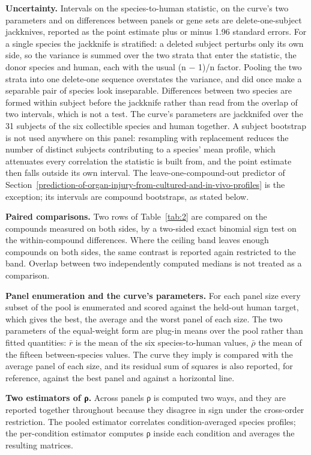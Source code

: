 \documentclass[11pt,a4paper]{article}
\begin{document}
\textbf{Uncertainty.} Intervals on the species-to-human statistic, on
the curve's two parameters and on differences between panels or gene
sets are delete-one-subject jackknives, reported as the point estimate
plus or minus 1.96 standard errors. For a single species the jackknife
is stratified: a deleted subject perturbs only its own side, so the
variance is summed over the two strata that enter the statistic, the
donor species and human, each with the usual (n − 1)/n factor. Pooling
the two strata into one delete-one sequence overstates the variance, and
did once make a separable pair of species look inseparable. Differences
between two species are formed within subject before the jackknife
rather than read from the overlap of two intervals, which is not a test.
The curve's parameters are jackknifed over the 31 subjects of the six
collectible species and human together. A subject bootstrap is not used
anywhere on this panel: resampling with replacement reduces the number
of distinct subjects contributing to a species' mean profile, which
attenuates every correlation the statistic is built from, and the point
estimate then falls outside its own interval. The leave-one-compound-out
predictor of Section~\ref{prediction-of-organ-injury-from-cultured-and-in-vivo-profiles} is the exception; its intervals are compound
bootstraps, as stated below.

\textbf{Paired comparisons.} Two rows of Table~\ref{tab:2} are compared on the
compounds measured on both sides, by a two-sided exact binomial sign
test on the within-compound differences. Where the ceiling band leaves
enough compounds on both sides, the same contrast is reported again
restricted to the band. Overlap between two independently computed
medians is not treated as a comparison.

\textbf{Panel enumeration and the curve's parameters.} For each panel
size every subset of the pool is enumerated and scored against the
held-out human target, which gives the best, the average and the worst
panel of each size. The two parameters of the equal-weight form are
plug-in means over the pool rather than fitted quantities: \ensuremath{\bar{r}} is the mean
of the six species-to-human values, \ensuremath{\bar{\rho}} the mean of the fifteen
between-species values. The curve they imply is compared with the
average panel of each size, and its residual sum of squares is also
reported, for reference, against the best panel and against a horizontal
line.

\textbf{Two estimators of ρ.} Across panels ρ is computed two ways, and
they are reported together throughout because they disagree in sign
under the cross-order restriction. The pooled estimator correlates
condition-averaged species profiles; the per-condition estimator
computes ρ inside each condition and averages the resulting matrices.
\end{document}
